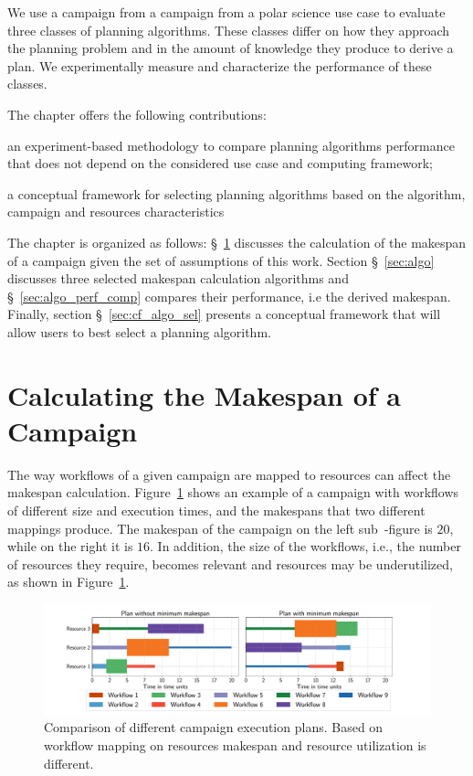 We use a campaign from a campaign from a polar science use case to evaluate three classes of planning algorithms.
These classes differ on how they approach the planning problem and in the amount of knowledge they produce to derive a plan.
We experimentally measure and characterize the performance of these classes.

The chapter offers the following contributions:
\begin{inparaenum}[i)]
    \item an experiment-based methodology to compare planning algorithms performance that does not depend on the considered use case and computing framework;
    \item a conceptual framework for selecting planning algorithms based on the algorithm, campaign and resources characteristics
\end{inparaenum}

The chapter is organized as follows: \S~\ref{sec:makespan_calc} discusses the calculation of the makespan of a campaign given the set of assumptions of this work.
Section \S~\ref{sec:algo} discusses three selected makespan calculation algorithms and \S~\ref{sec:algo_perf_comp} compares their performance, i.e the derived makespan.
Finally, section \S~\ref{sec:cf_algo_sel} presents a conceptual framework that will allow users to best select a planning algorithm.

\section{Calculating the Makespan of a Campaign}
\label{sec:makespan_calc}
The way workflows of a given campaign are mapped to resources can affect the makespan calculation. 
Figure~\ref{fig:example_makespan} shows an example of a campaign with workflows of different size and execution times, and the makespans that two different mappings produce.
The makespan of the campaign on the left sub~-figure is $20$, while on the right it is $16$.
In addition, the size of the workflows, i.e., the number of resources they require, becomes relevant and resources may be underutilized, as shown in Figure~\ref{fig:example_makespan}.

\begin{figure}[ht!]
    \centering
    \includegraphics[width=.99\textwidth]{figures/campaign/plan_comp.pdf}
    \caption{Comparison of different campaign execution plans. Based on workflow mapping on resources makespan and resource utilization is different.}\label{fig:example_makespan}
\end{figure}

